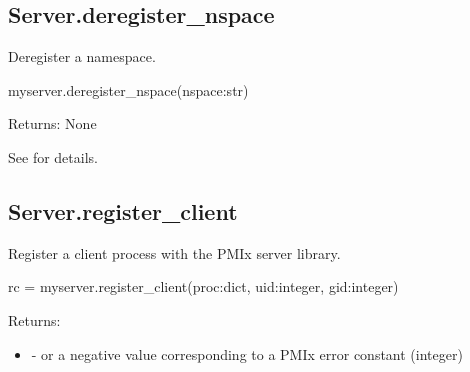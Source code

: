 \subsection{Server.deregister_nspace}

\summary

Deregister a namespace.

\format

\pyspecificstart
\begin{codepar}
myserver.deregister_nspace(nspace:str)
\end{codepar}
\pyspecificend


\begin{arglist}
\end{arglist}

Returns: None

See  for details.


\subsection{Server.register_client}

\summary
Register a client process with the PMIx server library.

\format

\pyspecificstart
\begin{codepar}
rc = myserver.register_client(proc:dict, uid:integer, gid:integer)
\end{codepar}
\pyspecificend


\begin{arglist}
\end{arglist}

Returns:

\begin{itemize}
    \item {} -  or a negative value corresponding to a PMIx error constant (integer)
\end{itemize}

